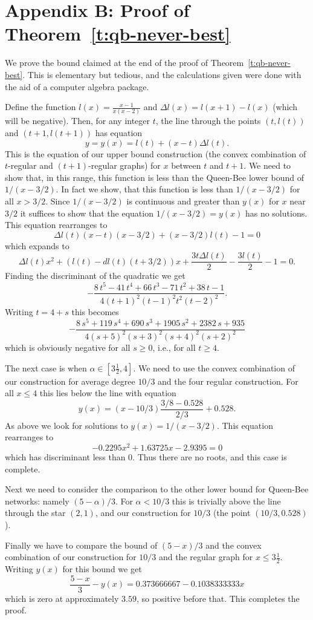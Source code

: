 \documentclass[11pt]{article}
\theoremstyle{remark}
\def\a{\alpha}
\begin{document}
\section*{Appendix B: Proof of Theorem~\ref{t:qb-never-best}}
We prove the bound claimed at the end of the proof of
Theorem~\ref{t:qb-never-best}. This is elementary but tedious, and the
calculations given were done with the aid of a computer algebra
package.

Define the function $l(x)=\frac{x-1}{x(x-2)}$ and $\Delta
l(x)=l(x+1)-l(x)$ (which will be negative). Then, for any integer $t$,
the line through the points $(t,l(t))$ and $(t+1,l(t+1))$ has equation 
\[y=y(x)=l(t)+(x-t)\Delta l(t).\] This is the equation of our upper
bound construction (the convex combination of $t$-regular and
$(t+1)$-regular graphs) for $x$ between $t$ and $t+1$. We need to show
that, in this range, this function is less than the Queen-Bee lower
bound of $1/(x-3/2)$. In fact we show, that this function is less than
$1/(x-3/2)$ for all $x>3/2$. Since $1/(x-3/2)$ is continuous and
greater than $y(x)$ for $x$ near $3/2$ it suffices to show that the
equation $1/(x-3/2)=y(x)$ has no solutions. This equation rearranges to
\[\Delta l(t)(x-t)(x-3/2)+(x-3/2)l(t)-1 =0
\]
which expands to 
\[\Delta l(t)x^2+\left(l(t)-dl(t)(t+3/2)\right)x+\frac{3t\Delta
  l(t)}2-\frac{3l(t)}2-1=0.
\]
Finding the discriminant of the quadratic we get
\[
-\frac {8\,{t}^{5}-41\,{t}^{4}+66\,{t}^{3}-71\,{t}^{2}+38\,t-1}{ 4\left( t+1 \right) ^{2
} \left( t-1 \right) ^{2}{t}^{2} \left( t-2 \right) ^{2}}.
\]
Writing $t=4+s$ this becomes
\[
-{\frac {8\,{s}^{5}+119\,{s}^{4}+690\,{s}^{3}+1905\,{s}^{2}+2382\,s+935}{ 4\left( s+5
 \right) ^{2} \left( s+3 \right) ^{2} \left( s+4 \right) ^{2} \left( s+2 \right) ^{2}}}
\]
which is obviously negative for all $s\ge 0$, i.e., for all $t\ge4$.

\medskip

The next case is when $\a\in[3\frac12,4]$. We need to use the convex
combination of our construction for average degree $10/3$ and the four
regular construction. For all $x\le 4$ this lies below the line with
equation
\[y(x)=(x-10/3)\frac{3/8-0.528}{2/3}+0.528.
\]
As above we look for solutions to $y(x)=1/(x-3/2)$. This equation rearranges to
\[
- 0.2295x^{2}+ 1.63725x- 2.9395=0
\]
which has discriminant less than 0. Thus there are no roots, and this
case is complete.

Next we need to consider the comparison to the other lower bound for
Queen-Bee networks: namely $(5-\a)/3$. For $\a<10/3$ this is trivially
above the line through the star $(2,1)$, and our construction for
$10/3$ (the point $(10/3,0.528)$). 

Finally we have to compare the bound of $(5-x)/3$ and the convex
combination of our construction for $10/3$ and the regular graph for
$x\le3\frac12$. Writing $y(x)$ for  this bound we get
\[\frac{5-x}{3}-y(x)= 0.373666667 - 0.1038333333 x
\]
which is zero at approximately $3.59$, so positive before that. This completes the proof.
\end{document}
